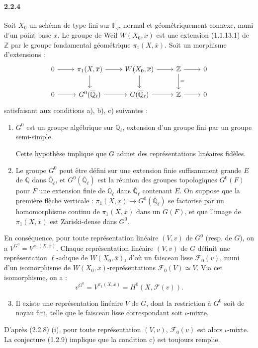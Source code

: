 \documentclass[12pt,a4paper]{article}
\theoremstyle{plain}
\theoremstyle{definition}
\theoremstyle{remark}
\newcommand{\FF}{{\mathbb{F}}}
\newcommand{\QQ}{{\mathbb{Q}}}
\newcommand{\ZZ}{{\mathbb{Z}}}
\newcommand{\QQbar}{{\overline{\QQ}}}
\begin{document}
\paragraph{2.2.4}
Soit $X_0$ un sch\'ema de type fini sur $\FF_q$, normal et g\'eom\'etriquement connexe, muni d'un point base $\overline{x}$. Le groupe de Weil $W(X_0, \overline{x})$ est une extension (1.1.13.1) de $\ZZ$ par le groupe fondamental g\'eom\'etrique $\pi_1(X, \overline{x})$. Soit un morphisme d'extensions :
\[
\begin{tikzcd}
0 \arrow[r] & \pi_1(X, \overline{x}) \arrow[r] \arrow[d] & W(X_0, \overline{x}) \arrow[r] \arrow[d] & \ZZ \arrow[r] \arrow[d, "="] & 0 \\
0 \arrow[r] & G^0(\QQbar_\ell) \arrow[r] & G(\QQbar_\ell) \arrow[r] & \ZZ \arrow[r] & 0
\end{tikzcd}
\]
satisfaisant aux conditions a), b), c) suivantes :
\begin{enumerate}[label=\alph*)]
\item $G^0$ est un groupe alg\'ebrique sur $\QQ_\ell$, extension d'un groupe fini par un groupe semi-simple.

Cette hypoth\`ese implique que $G$ admet des repr\'esentations lin\'eaires fid\`eles.
\item Le groupe $G^0$ peut \^etre d\'efini sur une extension finie suffisamment grande $E$ de $\QQ$ dans $\QQbar_\ell$, et $G^0(\QQbar_\ell)$ est la r\'eunion des groupes topologiques $G^0(F)$ pour $F$ une extension finie de $\QQ_\ell$ dans $\QQbar_\ell$ contenant $E$. On suppose que la premi\`ere fl\`eche verticale : $\pi_1(X, \overline{x}) \to G^0(\QQbar_\ell)$ se factorise par un homomorphisme continu de $\pi_1(X, \overline{x})$ dans un $G(F)$, et que l'image de $\pi_1(X, \overline{x})$ est Zariski-dense dans $G^0$.
\end{enumerate}

En cons\'equence, pour toute repr\'esentation lin\'eaire $(V, v)$ de $G^0$ (resp. de $G$), on a $V^{G^0} = V^{\pi_1(X, \overline{x})}$. Chaque repr\'esentation lin\'eaire $(V, v)$ de $G$ d\'efinit une repr\'esentation $\ell$-adique de $W(X_0, \overline{x})$, d'o\`u un faisceau lisse $\mathscr{F}_0(v)$, muni d'un isomorphisme de $W(X_0, \overline{x})$-repr\'esentations $\mathscr{F}_0(V) \simeq V$. Via cet isomorphisme, on a :
\[ v^{G^0} = V^{\pi_1(X, \overline{x})} = H^0(X, \mathscr{F}(v)). \]

\begin{enumerate}[label=\alph*)]
\setcounter{enumi}{2}
\item Il existe une repr\'esentation lin\'eaire $V$ de $G$, dont la restriction \`a $G^0$ soit de noyau fini, telle que le faisceau lisse correspondant soit $\iota$-mixte.
\end{enumerate}
D'apr\`es (2.2.8) (i), pour toute repr\'esentation $(V, v)$, $\mathscr{F}_0(v)$ est alors $\iota$-mixte. La conjecture (1.2.9) implique que la condition c) est toujours remplie.
\end{document}
